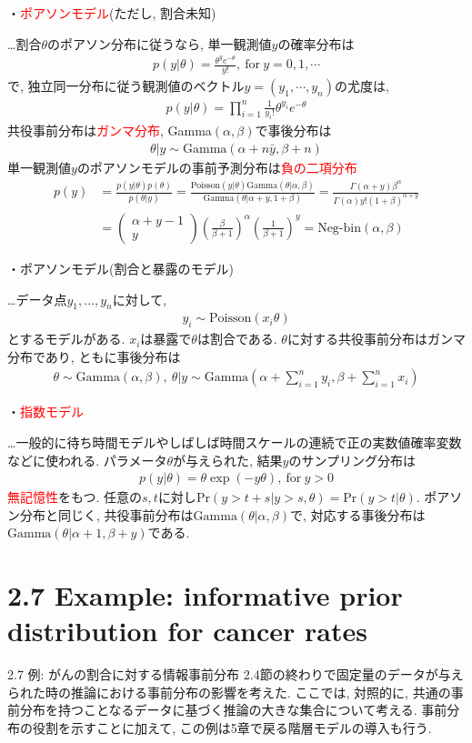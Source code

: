 \documentclass[10pt,dvipdfmx,a4]{beamer}
\newcommand{\eqn}[1]{\begin{align*}#1\end{align*}}
\newcommand{\tcr}[1]{\textcolor{red}{#1}}
\begin{document}
\begin{frame}
・\tcr{ポアソンモデル}(ただし, 割合未知)

…割合$\theta$のポアソン分布に従うなら, 単一観測値$y$の確率分布は
\eqn{p(y|\theta)=\frac{\theta^ye^{-\theta}}{y!},\ \text{for}\ y=0,1,\cdots}
で, 独立同一分布に従う観測値のベクトル$y=(y_1,\cdots,y_n)$の尤度は,
\eqn{p(y|\theta)=\prod_{i=1}^n\frac{1}{y_i!}\theta^{y_i}e^{-\theta}}
共役事前分布は\tcr{ガンマ分布}, Gamma$(\alpha,\beta)$で事後分布は
\eqn{\theta|y\sim \text{Gamma}(\alpha+n\bar{y},\beta+n)}
単一観測値$y$のポアソンモデルの事前予測分布は\tcr{負の二項分布}
\eqn{p(y)&=\tfrac{p(y|\theta)p(\theta)}{p(\theta|y)}=\tfrac{\text{Poisson}(y|\theta)\text{Gamma}(\theta|\alpha,\beta)}{\text{Gamma}(\theta|\alpha+y,1+\beta)}=\tfrac{\Gamma(\alpha+y)\beta^{\alpha}}{\Gamma(\alpha)y!(1+\beta)^{\alpha+y}}\\
&=\left(\begin{array}{c}\alpha+y-1\\y\end{array}\right) \left(\frac{\beta}{\beta+1}\right)^{\alpha}\left(\frac{1}{\beta+1}\right)^y=\text{Neg-bin}(\alpha,\beta)}
\end{frame}


\begin{frame}
・ポアソンモデル(割合と暴露のモデル)

…データ点$y_1,\dots,y_n$に対して,
\eqn{y_i\sim \text{Poisson}(x_i\theta)}
とするモデルがある.
$x_i$は暴露で$\theta$は割合である.
$\theta$に対する共役事前分布はガンマ分布であり, ともに事後分布は
\eqn{\theta\sim\text{Gamma}(\alpha,\beta),\ \theta|y \sim \text{Gamma}\left(\alpha+\sum_{i=1}^n y_i, \beta+\sum_{i=1}^n x_i\right)}

・\tcr{指数モデル}

…一般的に待ち時間モデルやしばしば時間スケールの連続で正の実数値確率変数などに使われる.
パラメータ$\theta$が与えられた, 結果$y$のサンプリング分布は
\eqn{p(y|\theta)=\theta\exp(-y\theta),\ \text{for}\ y>0}
\tcr{無記憶性}をもつ.
任意の$s, t$に対し$\text{Pr}(y>t+s|y>s,\theta)=\text{Pr}(y>t|\theta)$.
ポアソン分布と同じく, 共役事前分布は$\text{Gamma}(\theta|\alpha,\beta)$で, 対応する事後分布は$\text{Gamma}(\theta|\alpha+1,\beta+y)$である.
\end{frame}

\section{2.7 Example: informative prior distribution for cancer rates}
\begin{frame}{2.7 例: がんの割合に対する情報事前分布}
2.4節の終わりで固定量のデータが与えられた時の推論における事前分布の影響を考えた.
ここでは, 対照的に, 共通の事前分布を持つことなるデータに基づく推論の大きな集合について考える.
事前分布の役割を示すことに加えて, この例は5章で戻る階層モデルの導入も行う.
\end{frame}
\end{document}
